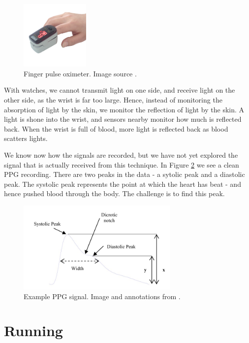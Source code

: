 \documentclass[12pt,a4paper,twoside,openright]{report}
\begin{document}
\begin{figure}[h!]
	\centerline{\includegraphics[width=0.3\textwidth]{figs/fingerppg.jpg}}
	\caption{Finger pulse oximeter. Image source \cite{wiki:fingerppg}.}
\label{fig:fingerppg}
\end{figure}

With watches, we cannot transmit light on one side, and
receive light on the other side, as the wrist is far too large. Hence, instead
of monitoring the absorption of light by the skin, we monitor the reflection
of light by the skin. A light is shone into the wrist, and sensors nearby
monitor how much is reflected back. When the wrist is full of blood, more
light is reflected back as blood scatters lights.

We know now how the signals are recorded, but we have not yet explored the
signal that is actually received from this technique. In Figure
\ref{fig:typicalppgsignal} we see a
clean PPG recording. There are two peaks in the data - a sytolic peak and a
diastolic peak. The systolic peak represents the point at which the heart has
beat - and hence pushed blood through the body. The challenge is to find this
peak.

\begin{figure}[h!]
	\centerline{\includegraphics[width=0.7\textwidth]{figs/typicalppgsignal.jpeg}}
	\caption{Example PPG signal. Image and annotations from \cite{elgendi12}.}
\label{fig:typicalppgsignal}
\end{figure}

\section{Running}
\end{document}
